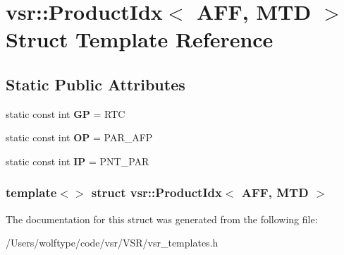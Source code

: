 \hypertarget{structvsr_1_1_product_idx_3_01_a_f_f_00_01_m_t_d_01_4}{\section{vsr\-:\-:Product\-Idx$<$ A\-F\-F, M\-T\-D $>$ Struct Template Reference}
\label{structvsr_1_1_product_idx_3_01_a_f_f_00_01_m_t_d_01_4}
}
\subsection*{Static Public Attributes}
\begin{DoxyCompactItemize}
\item 
\hypertarget{structvsr_1_1_product_idx_3_01_a_f_f_00_01_m_t_d_01_4_abd3ddaad82622e8226053076d0700f65}{static const int {\bfseries G\-P} = R\-T\-C}\label{structvsr_1_1_product_idx_3_01_a_f_f_00_01_m_t_d_01_4_abd3ddaad82622e8226053076d0700f65}

\item 
\hypertarget{structvsr_1_1_product_idx_3_01_a_f_f_00_01_m_t_d_01_4_a45bc47908b7ce8c64196fe6ab0f2dd0f}{static const int {\bfseries O\-P} = P\-A\-R\-\_\-\-A\-F\-P}\label{structvsr_1_1_product_idx_3_01_a_f_f_00_01_m_t_d_01_4_a45bc47908b7ce8c64196fe6ab0f2dd0f}

\item 
\hypertarget{structvsr_1_1_product_idx_3_01_a_f_f_00_01_m_t_d_01_4_a224037611210237cae8a6a6ff2f65067}{static const int {\bfseries I\-P} = P\-N\-T\-\_\-\-P\-A\-R}\label{structvsr_1_1_product_idx_3_01_a_f_f_00_01_m_t_d_01_4_a224037611210237cae8a6a6ff2f65067}

\end{DoxyCompactItemize}
\subsubsection*{template$<$$>$ struct vsr\-::\-Product\-Idx$<$ A\-F\-F, M\-T\-D $>$}



The documentation for this struct was generated from the following file\-:\begin{DoxyCompactItemize}
\item 
/\-Users/wolftype/code/vsr/\-V\-S\-R/vsr\-\_\-templates.\-h\end{DoxyCompactItemize}
